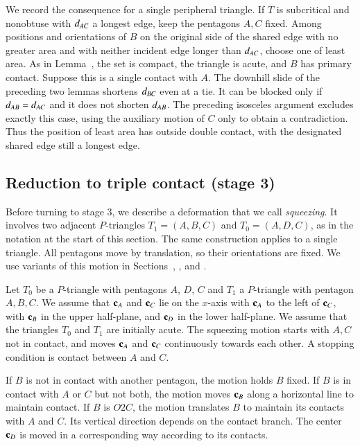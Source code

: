 We record the consequence for a single peripheral triangle. If $T$ is
subcritical and nonobtuse with $d_{AC}$ a longest edge, keep the
pentagons $A,C$ fixed. Among positions and orientations of $B$ on the
original side of the shared edge with no greater area and with neither
incident edge longer than $d_{AC}$, choose one of least area. As in
Lemma~, the set is compact, the triangle is acute,
and $B$ has primary contact. Suppose this is a single contact with $A$.
The downhill slide of the preceding two lemmas shortens $d_{BC}$ even at a tie. It can be blocked
only if $d_{AB}=d_{AC}$ and it does not shorten $d_{AB}$.
The preceding isosceles argument excludes exactly this case, using
the auxiliary motion of $C$ only to obtain a contradiction.
Thus the position of least area has outside double contact, with
the designated shared edge still a longest edge.

\subsection{Reduction to triple contact (stage 3)}

Before turning to stage 3, we describe a deformation that we
call \emph{squeezing}.  It involves two adjacent $P$-triangles
$T_1=(A,B,C)$ and $T_0=(A,D,C)$, as in the notation at the
start of this section.  The same construction applies to a single
triangle.  All pentagons move by translation, so their orientations
are fixed.  We use variants of this motion in
Sections~, , and
.

Let $T_0$ be a $P$-triangle with pentagons $A$, $D$, $C$ and $T_1$ a
$P$-triangle with pentagon $A,B,C$.  We assume that ${\mathbf c}_A$ and ${\mathbf c}_C$
lie on the $x$-axis with ${\mathbf c}_A$ to the left of ${\mathbf c}_C$, with ${\mathbf c}_B$ in
the upper half-plane, and ${\mathbf c}_D$ in the lower half-plane.  We assume
that the triangles $T_0$ and $T_1$ are initially acute.  The squeezing
motion starts with $A,C$ not in contact, and moves ${\mathbf c}_A$ and
${\mathbf c}_C$ continuously towards each other.  A stopping condition is
contact between $A$ and $C$.

If $B$ is not in contact with another pentagon, the motion holds $B$ fixed.
If $B$ is in contact with $A$ or $C$ but not both, the motion
moves ${\mathbf c}_B$ along a horizontal line to maintain contact.
If $B$ is $O2C$, the motion translates $B$ to maintain its contacts
with $A$ and $C$. Its vertical direction depends on the contact branch.
The center ${\mathbf c}_D$ is moved in a corresponding way according to its contacts.

